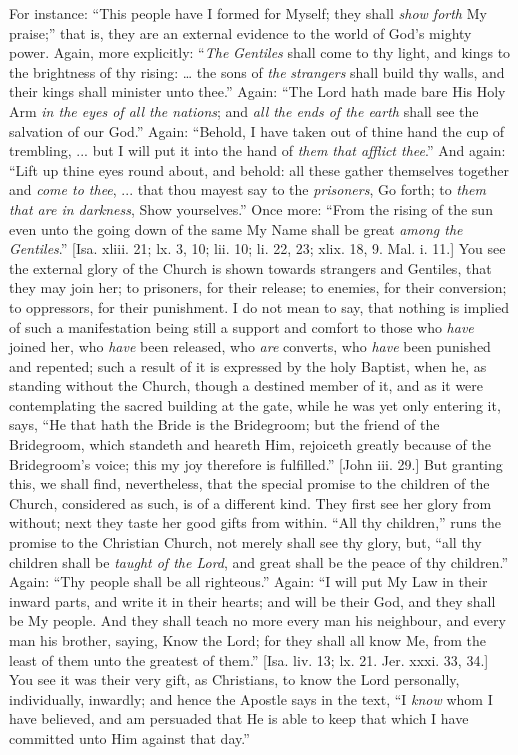 For instance: ``This people have I formed for Myself; they
shall \emph{show forth} My praise;'' that is, they are an external
evidence to the world of God's mighty power. Again, more explicitly:
``\emph{The} \emph{Gentiles} shall come to thy light, and kings to
the brightness of thy rising: … the sons of \emph{the} \emph{strangers}
shall build thy walls, and their kings shall minister unto thee.''
Again: ``The Lord hath made bare His Holy Arm \emph{in the eyes of
all the nations}; and \emph{all the ends of the earth} shall see
the salvation of our God.'' Again: ``Behold, I have taken out
of thine hand the cup of trembling, ... but I will put it into the
hand of \emph{them that afflict thee}.'' And again: ``Lift up
thine eyes round about, and behold: all these gather themselves
together and \emph{come to thee}, ... that thou mayest say to the \emph{prisoners},
Go forth; to \emph{them that are in darkness}, Show yourselves.''
Once more: ``From the rising of the sun even unto the going down
of the same My Name shall be great \emph{among the Gentiles}.'' [Isa.
xliii. 21; lx. 3, 10; lii. 10; li. 22, 23; xlix. 18, 9. Mal. i. 11.]
You see the external glory of the Church is shown towards strangers
and Gentiles, that they may join her; to prisoners, for their release;
to enemies, for their conversion; to oppressors, for their punishment.
I do not mean to say, that nothing is implied of such a manifestation
being still a support and comfort to those who \emph{have} joined her,
who \emph{have} been released, who \emph{are} converts, who \emph{have}
been punished and repented; such a result of it is expressed by the
holy Baptist, when he, as standing without the Church, though a
destined member of it, and as it were contemplating the sacred
building at the gate, while he was yet only entering it, says,
``He that hath the Bride is the Bridegroom; but the friend of the
Bridegroom, which standeth and heareth Him, rejoiceth greatly because
of the Bridegroom's voice; this my joy therefore is fulfilled.''
[John iii. 29.] But granting this, we shall find, nevertheless, that
the special promise to the children of the Church, considered as such,
is of a different kind. They first see her glory from without; next
they taste her good gifts from within. ``All thy children,''
runs the promise to the Christian Church, not merely shall see thy
glory, but, ``all thy children shall be \emph{taught of the Lord},
and great shall be the peace of thy children.'' Again: ``Thy
people shall be all righteous.'' Again: ``I will put My Law in
their inward parts, and write it in their hearts; and will be their
God, and they shall be My people. And they shall teach no more every
man his neighbour, and every man his brother, saying, Know the Lord;
for they shall all know Me, from the least of them unto the greatest
of them.'' [Isa. liv. 13; lx. 21. Jer. xxxi. 33, 34.] You see it
was their very gift, as Christians, to know the Lord personally,
individually, inwardly; and hence the Apostle says in the text,
``I \emph{know} whom I have believed, and am persuaded that He is
able to keep that which I have committed unto Him against that
day.''

